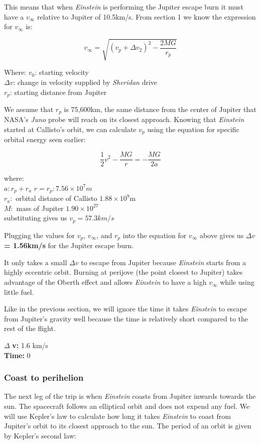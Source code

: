 \documentclass[12pt]{article} %
\begin{document}
This means that when \textit{Einstein} is performing the Jupiter escape burn it must have a $v_{\infty}$ relative to Jupiter of 10.5km/s. From section 1 we know the expression for $v_{\infty}$ is:

$$v_{\infty} = \sqrt{(v_p + \Delta v_2)^2-\frac{2MG}{r_p}}$$

Where:
$v_0$: starting velocity\\
$\Delta v$: change in velocity supplied by \textit{Sheridan} drive\\
$r_p$: starting distance from Jupiter

We assume that $r_p$ is 75,600km, the same distance from the center of Jupiter that NASA's \textit{Juno} probe will reach on its closest approach. Knowing that \textit{Einstein} started at Callisto's orbit, we can calculate $v_p$ using the equation for specific orbital energy seen earlier:

$$\frac{1}{2}v^2-\frac{MG}{r} = -\frac{MG}{2a}$$

where:\\
$a: r_p + r_a$
$r = r_p: 7.56\times 10^7m$\\
$r_a:$ orbital distance of Callisto $1.88 \times 10^9$m\\
$M:$ mass of Jupiter $1.90\times10^27$\\


substituting gives us \textbf{$v_p = 57.3 km/s$}

Plugging the values for $v_p$, $v_{\infty}$, and $r_p$ into the equation for $v_{\infty}$ above gives us $\Delta v$ \textbf{= 1.56km/s} for the Jupiter escape burn.

It only takes a small $\Delta v$ to escape from Jupiter because \textit{Einstein} starts from a highly eccentric orbit. Burning at perijove (the point closest to Jupiter) takes advantage of the Oberth effect and allows \textit{Einstein} to have a high $v_{\infty}$ while using little fuel.

Like in the previous section, we will ignore the time it takes \textit{Einstein} to escape from Jupiter's gravity well because the time is relatively short compared to the rest of the flight. 


$\Delta$ \textbf{v:} 1.6 km/s\\
\textbf{Time:} 0

\subsubsection{Coast to perihelion}
The next leg of the trip is when \textit{Einstein} coasts from Jupiter inwards towards the sun. The spacecraft follows an elliptical orbit and does not expend any fuel. We will use Kepler's law to calculate how long it takes \textit{Einstein} to coast from Jupiter's orbit to its closest approach to the sun. The period of an orbit is given by Kepler's second law:
\end{document}
